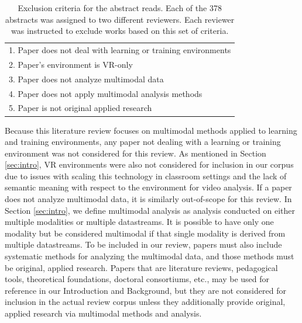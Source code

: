 \documentclass[manuscript,screen,review]{acmart}
\begin{document}
\begin{table}[htbp]
    \renewcommand{\arraystretch}{1.3}%
    \centering
    \caption{Exclusion criteria for the abstract reads. Each of the 378 abstracts was assigned to two different reviewers. Each reviewer was instructed to exclude works based on this set of criteria.}
    \begin{tabularx}{\linewidth}{l@{\hskip .25in}}
        \midrule
        1. Paper does not deal with learning or training environments \\
        2. Paper's environment is VR-only \\
        3. Paper does not analyze multimodal data \\
        4. Paper does not apply multimodal analysis methods \\
        5. Paper is not original applied research\\
        \bottomrule
    \end{tabularx}
    \label{tab:abstract_exclusion_criteria}
\end{table}

Because this literature review focuses on multimodal methods applied to learning and training environments, any paper not dealing with a learning or training environment was not considered for this review. As mentioned in Section \ref{sec:intro}, VR environments were also not considered for inclusion in our corpus due to issues with scaling this technology in classroom settings and the lack of semantic meaning with respect to the environment for video analysis. If a paper does not analyze multimodal data, it is similarly out-of-scope for this review. In Section \ref{sec:intro}, we define multimodal analysis as analysis conducted on either multiple modalities or multiple datastreams. It is possible to have only one modality but be considered multimodal if that single modality is derived from multiple datastreams. To be included in our review, papers must also include systematic methods for analyzing the multimodal data, and those methods must be original, applied research. Papers that are literature reviews, pedagogical tools, theoretical foundations, doctoral consortiums, etc., may be used for reference in our Introduction and Background, but they are not considered for inclusion in the actual review corpus unless they additionally provide original, applied research via multimodal methods and analysis.
\end{document}
